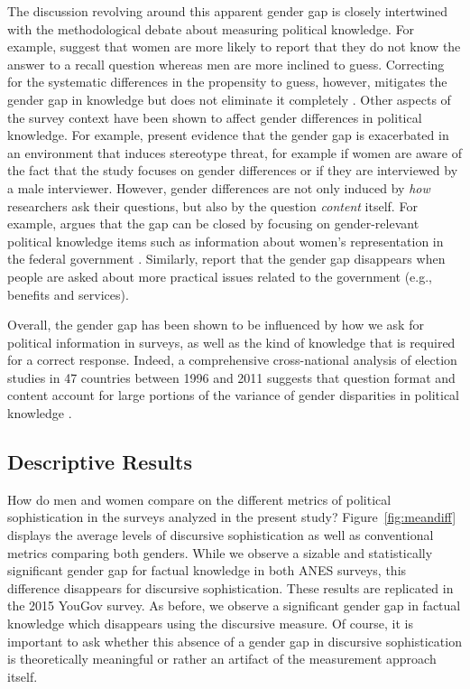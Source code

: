 The discussion revolving around this apparent gender gap is closely intertwined with the methodological debate about measuring political knowledge. For example, \citet{mondak2004knowledge} suggest that women are more likely to report that they do not know the answer to a recall question whereas men are more inclined to guess. Correcting for the systematic differences in the propensity to guess, however, mitigates the gender gap in knowledge but does not eliminate it completely \citep[see also][]{lizotte2009explaining}. Other aspects of the survey context have been shown to affect gender differences in political knowledge. For example, \citet{mcglone2006stereotype} present evidence that the gender gap is exacerbated in an environment that induces stereotype threat, for example if women are aware of the fact that the study focuses on gender differences or if they are interviewed by a male interviewer. However, gender differences are not only induced by \textit{how} researchers ask their questions, but also by the question \textit{content} itself. For example, \citet{dolan2011women} argues that the gap can be closed by focusing on gender-relevant political knowledge items such as information about women's representation in the federal government \citep[see also][]{graber2001processing,fraile2014does,jerit2017revisiting}. Similarly, \citet{stolle2010women} report that the gender gap disappears when people are asked about more practical issues related to the government (e.g., benefits and services).

Overall, the gender gap has been shown to be influenced by how we ask for political information in surveys, as well as the kind of knowledge that is required for a correct response. Indeed, a comprehensive cross-national analysis of election studies in 47 countries between 1996 and 2011 suggests that question format and content account for large portions of the variance of gender disparities in political knowledge \citep{fortin2016cross}.


\subsection{Descriptive Results}
How do men and women compare on the different metrics of political sophistication in the surveys analyzed in the present study? Figure~\ref{fig:meandiff} displays the average levels of discursive sophistication as well as conventional metrics comparing both genders. While we observe a sizable and statistically significant gender gap for factual knowledge in both ANES surveys, this difference disappears for discursive sophistication. These results are replicated in the 2015 YouGov survey. As before, we observe a significant gender gap in factual knowledge which disappears using the discursive measure. Of course, it is important to ask whether this absence of a gender gap in discursive sophistication is theoretically meaningful or rather an artifact of the measurement approach itself. 

